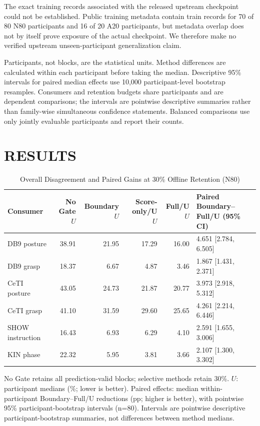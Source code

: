 \documentclass[conference,letterpaper]{IEEEtran}
\begin{document}
The exact training records associated with the released upstream checkpoint could not be established. Public training metadata contain train records for 70 of 80 N80 participants and 16 of 20 A20 participants, but metadata overlap does not by itself prove exposure of the actual checkpoint. We therefore make no verified upstream unseen-participant generalization claim.

Participants, not blocks, are the statistical units. Method differences are calculated within each participant before taking the median. Descriptive 95\% intervals for paired median effects use 10,000 participant-level bootstrap resamples. Consumers and retention budgets share participants and are dependent comparisons; the intervals are pointwise descriptive summaries rather than family-wise simultaneous confidence statements. Balanced comparisons use only jointly evaluable participants and report their counts.




\section{RESULTS}\label{results}
\begin{table}[!b]
\centering
\caption{Overall Disagreement and Paired Gains at 30\% Offline Retention (N80)}
\label{tab:overall}
\begingroup
\small
\setlength{\tabcolsep}{3pt}
\renewcommand{\arraystretch}{1.05}
\begin{tabular}{lrrrrl}
\toprule
Consumer & No Gate $U$ & Boundary $U$ & Score-only/U $U$ & Full/U $U$ & Paired Boundary--Full/U (95\% CI)\\
\midrule
DB9 posture & 38.91 & 21.95 & 17.29 & 16.00 & 4.651 [2.784, 6.505]\\
DB9 grasp & 18.37 & 6.67 & 4.87 & 3.46 & 1.867 [1.431, 2.371]\\
CeTI posture & 43.05 & 24.73 & 21.87 & 20.77 & 3.973 [2.918, 5.312]\\
CeTI grasp & 41.10 & 31.59 & 29.60 & 25.65 & 4.261 [2.214, 6.446]\\
SHOW instruction & 16.43 & 6.93 & 6.29 & 4.10 & 2.591 [1.655, 3.006]\\
KIN phase & 22.32 & 5.95 & 3.81 & 3.66 & 2.107 [1.300, 3.302]\\
\bottomrule
\end{tabular}
\par\smallskip
\begin{minipage}{\linewidth}\footnotesize
No Gate retains all prediction-valid blocks; selective methods retain 30\%. $U$: participant medians (\%; lower is better). Paired effects: median within-participant Boundary--Full/U reductions (pp; higher is better), with pointwise 95\% participant-bootstrap intervals (n=80). Intervals are pointwise descriptive participant-bootstrap summaries, not differences between method medians.
\end{minipage}
\endgroup

\end{table}
\end{document}
